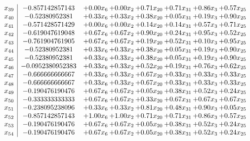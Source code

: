 \documentclass[8pt]{article}
\begin{document}
\[\begin{array}{c| c c@{\hskip 2pt} c@{\hskip 2pt} c@{\hskip 2pt} c@{\hskip 2pt} c@{\hskip 2pt} c@{\hskip 2pt} }
 x_{39}   &  -0.857142857143 & +  0.00 x_{6} & +  0.00 x_{2} & +  0.71 x_{20} & +  0.71 x_{31} & +  0.86 x_{3} & +  0.57 x_{25}\\
 x_{40}   &  -0.52380952381 & +  0.33 x_{6} & +  0.33 x_{2} & +  0.38 x_{20} & +  0.05 x_{31} & +  0.19 x_{3} & +  0.90 x_{25}\\
 x_{41}   &  -0.571428571429 & +  0.00 x_{6} & +  0.00 x_{2} & +  0.14 x_{20} & +  0.14 x_{31} & +  0.57 x_{3} & +  0.71 x_{25}\\
 x_{42}   &  -0.619047619048 & +  0.67 x_{6} & +  0.67 x_{2} & +  0.90 x_{20} & +  0.24 x_{31} & +  0.95 x_{3} & +  0.52 x_{25}\\
 x_{43}   &  -0.761904761905 & +  0.67 x_{6} & +  0.67 x_{2} & +  0.19 x_{20} & +  0.52 x_{31} & +  0.10 x_{3} & +  0.95 x_{25}\\
 x_{44}   &  -0.52380952381 & +  0.33 x_{6} & +  0.33 x_{2} & +  0.38 x_{20} & +  0.05 x_{31} & +  0.19 x_{3} & +  0.90 x_{25}\\
 x_{45}   &  -0.52380952381 & +  0.33 x_{6} & +  0.33 x_{2} & +  0.38 x_{20} & +  0.05 x_{31} & +  0.19 x_{3} & +  0.90 x_{25}\\
 x_{46}   &  -0.0952380952383 & +  0.33 x_{6} & +  0.33 x_{2} & +  0.52 x_{20} & +  0.19 x_{31} & +  0.76 x_{3} & +  0.62 x_{25}\\
 x_{47}   &  -0.666666666667 & +  0.33 x_{6} & +  0.33 x_{2} & +  0.67 x_{20} & +  0.33 x_{31} & +  0.33 x_{3} & +  0.33 x_{25}\\
 x_{48}   &  -0.666666666667 & +  0.33 x_{6} & +  0.33 x_{2} & +  0.67 x_{20} & +  0.33 x_{31} & +  0.33 x_{3} & +  0.33 x_{25}\\
 x_{49}   &  -0.190476190476 & +  0.67 x_{6} & +  0.67 x_{2} & +  0.05 x_{20} & +  0.38 x_{31} & +  0.52 x_{3} & +  0.24 x_{25}\\
 x_{50}   &  -0.333333333333 & +  0.67 x_{6} & +  0.67 x_{2} & +  0.33 x_{20} & +  0.67 x_{31} & +  0.67 x_{3} & +  0.67 x_{25}\\
 x_{51}   &  -0.238095238096 & +  0.33 x_{6} & +  0.33 x_{2} & +  0.81 x_{20} & +  0.48 x_{31} & +  0.90 x_{3} & +  0.05 x_{25}\\
 x_{52}   &  -0.857142857143 & +  1.00 x_{6} & +  1.00 x_{2} & +  0.71 x_{20} & +  0.71 x_{31} & +  0.86 x_{3} & +  0.57 x_{25}\\
 x_{53}   &  -0.190476190476 & +  0.67 x_{6} & +  0.67 x_{2} & +  0.05 x_{20} & +  0.38 x_{31} & +  0.52 x_{3} & +  0.24 x_{25}\\
 x_{54}   &  -0.190476190476 & +  0.67 x_{6} & +  0.67 x_{2} & +  0.05 x_{20} & +  0.38 x_{31} & +  0.52 x_{3} & +  0.24 x_{25}\\

\end{array}\]
\end{document}
